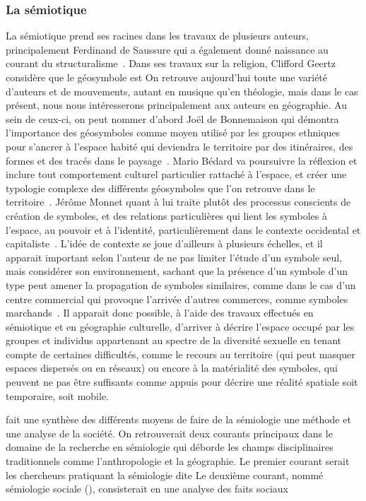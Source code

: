 \subsubsection{La sémiotique}
\label{ssub:la_semiotique}  La sémiotique prend ses racines dans les travaux de plusieurs auteurs, principalement Ferdinand de Saussure qui a également donné naissance au courant du structuralisme~\citep{Noth1995}. 
Dans ses travaux sur la religion, Clifford Geertz considère que le géosymbole est On retrouve aujourd'hui toute une variété d'auteurs et de mouvements, autant en musique qu'en théologie, mais dans le cas présent, nous nous intéresserons principalement aux auteurs en géographie. 
Au sein de ceux-ci, on peut nommer d'abord Joël de Bonnemaison qui démontra l'importance des géosymboles comme moyen utilisé par les groupes ethniques pour s'ancrer à l'espace habité qui deviendra le territoire par des itinéraires, des formes et des tracés dans le paysage~\citep{Bonnemaison1981}. 
Mario Bédard va poursuivre la réflexion et inclure tout comportement culturel particulier rattaché à l'espace, et créer une typologie complexe des différents géosymboles que l'on retrouve dans le territoire~\citep{Bedard2002}. 
Jérôme Monnet quant à lui traite plutôt des processus conscients de création de symboles, et des relations particulières qui lient les symboles à l'espace, au pouvoir et à l'identité, particulièrement dans le contexte occidental et capitaliste~\citep{Monnet1998}. 
L'idée de contexte se joue d'ailleurs à plusieurs échelles, et il apparait important selon l'auteur de ne pas limiter l'étude d'un symbole seul, mais considérer son environnement, sachant que la présence d'un symbole d'un type peut amener la propagation de symboles similaires, comme dans le cas d'un centre commercial qui provoque l'arrivée d'autres commerces, comme symboles marchands~\citep[7-8]{Monnet1998}.
Il apparait donc possible, à l'aide des travaux effectués en sémiotique et en géographie culturelle, d'arriver à décrire l'espace occupé par les groupes et individus appartenant au spectre de la diversité sexuelle en tenant compte de certaines difficultés, comme le recours au territoire (qui peut masquer espaces dispersés ou en réseaux) ou encore à la matérialité des symboles, qui peuvent ne pas être suffisants comme appuis pour décrire une réalité spatiale soit temporaire, soit mobile.

\citet[105--109]{Rose2012} fait une synthèse des différents moyens de faire de la sémiologie une méthode et une analyse de la société. 
On retrouverait deux courants principaux dans le domaine de la recherche en sémiologie qui déborde les champs disciplinaires traditionnels comme l'anthropologie et la géographie.
Le premier courant serait les chercheurs pratiquant la sémiologie dite  
Le deuxième courant, nommé sémiologie sociale (), consisterait en une analyse des faits sociaux

